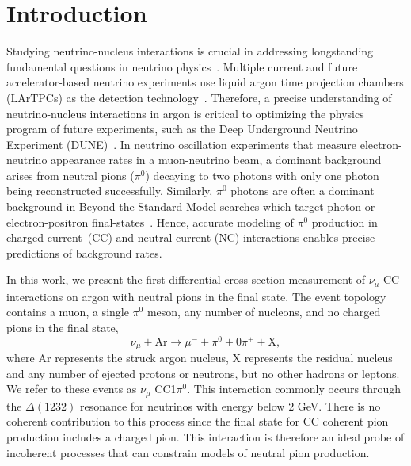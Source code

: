 \documentclass[%
 reprint,
 amsmath,amssymb, longbibliography,
 aps, 
 prd,
 twocolumn,
 showpacs,
 superscriptaddress
]{revtex4-2}
\begin{document}
\section{Introduction}
Studying neutrino-nucleus interactions is crucial in addressing longstanding fundamental questions in neutrino physics~\cite{PhysRevD.98.030001,PhysRevLett.123.151803,Nature}. Multiple current and future accelerator-based neutrino experiments use liquid argon time projection chambers (LArTPCs) as the detection technology~\cite{doi:10.1146/annurev-nucl-101917-020949,DUNE:2020jqi}. Therefore, a precise understanding of neutrino-nucleus interactions in argon is critical to optimizing the physics program of future experiments, such as the Deep Underground Neutrino Experiment (DUNE)~\cite{DUNE:2020jqi}. In neutrino oscillation experiments that measure electron-neutrino appearance rates in a muon-neutrino beam, a dominant background arises from neutral pions ($\pi^0$) decaying to two photons with only one photon being reconstructed successfully. Similarly, $\pi^0$ photons are often a dominant background in Beyond the Standard Model searches which target photon or electron-positron final-states~\cite{PhysRevLett.128.111801, PhysRevD.106.092006}. Hence, accurate modeling of $\pi^0$ production in charged-current~(CC) and neutral-current (NC) interactions enables precise predictions of background rates.

In this work, we present the first differential cross section measurement of $\nu_{\mu}$ CC interactions on argon with neutral pions in the final state. The event topology contains a muon, a single $\pi^0$ meson, any number of nucleons, and no charged pions in the final state,%
\begin{equation}
    \nu_{\mu} + \text{Ar} \rightarrow \mu^- + \pi^0 + 0 \pi^{\pm} + \text{X},
\end{equation}
where $\text{Ar}$ represents the struck argon nucleus, $\text{X}$ represents the residual nucleus and any number of ejected protons or neutrons, but no other hadrons or leptons. We refer to these events as $\nu_{\mu}$ CC1$\pi^0$. 
This interaction commonly occurs through the $\Delta(1232)$ resonance for neutrinos with energy below $2$ GeV. There is no coherent contribution to this process since the final state for CC coherent pion production includes a charged pion. This interaction is therefore an ideal probe of incoherent processes that can constrain models of neutral pion production. 
\end{document}

